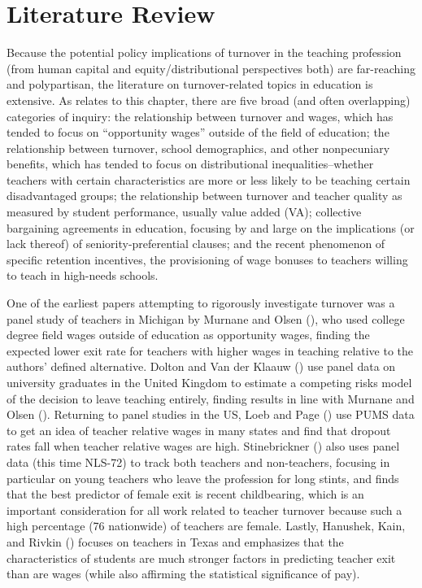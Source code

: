 
\section{Literature Review}\label{literature-review-ch1}

Because the potential policy implications of turnover in the teaching
profession (from human capital and equity/distributional perspectives
both) are far-reaching and polypartisan, the literature on
turnover-related topics in education is extensive. As relates to this
chapter, there are five broad (and often overlapping) categories of
inquiry: the relationship between turnover and wages, which has tended
to focus on ``opportunity wages'' outside of the field of education; the
relationship between turnover, school demographics, and other
nonpecuniary benefits, which has tended to focus on distributional
inequalities--whether teachers with certain characteristics are more or
less likely to be teaching certain disadvantaged groups; the
relationship between turnover and teacher quality as measured by student
performance, usually value added (VA); collective bargaining agreements
in education, focusing by and large on the implications (or lack
thereof) of seniority-preferential clauses; and the recent phenomenon of
specific retention incentives, the provisioning of wage bonuses to
teachers willing to teach in high-needs schools.

One of the earliest papers attempting to rigorously investigate turnover
was a panel study of teachers in Michigan by Murnane and Olsen
(\citeyear{murnane}), who used college degree field
wages outside of education as opportunity wages, finding the expected
lower exit rate for teachers with higher wages in teaching relative to
the authors' defined alternative. Dolton and Van der Klaauw
(\citeyear{dolton}) use panel data on university
graduates in the United Kingdom to estimate a competing risks model of
the decision to leave teaching entirely, finding results in line with
Murnane and Olsen (\citeyear{murnane}). Returning to
panel studies in the US, Loeb and Page
(\citeyear{loeb}) use PUMS data to get an idea of
teacher relative wages in many states and find that dropout rates fall
when teacher relative wages are high. Stinebrickner
(\citeyear{stinebrickner}) also uses panel data (this
time NLS-72) to track both teachers and non-teachers, focusing in
particular on young teachers who leave the profession for long stints,
and finds that the best predictor of female exit is recent childbearing,
which is an important consideration for all work related to teacher
turnover because such a high percentage (76 nationwide) of teachers are
female. Lastly, Hanushek, Kain, and Rivkin
(\citeyear{hanushek}) focuses on teachers in Texas
and emphasizes that the characteristics of students are much stronger
factors in predicting teacher exit than are wages (while also affirming
the statistical significance of pay).

